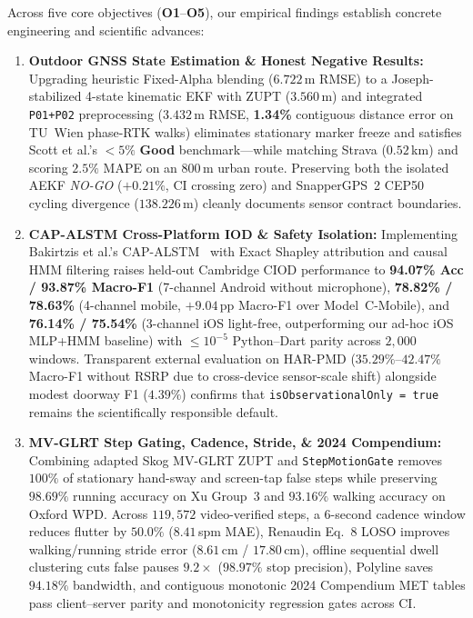 Across five core objectives (\textbf{O1}--\textbf{O5}), our empirical findings establish concrete engineering and scientific advances:
\begin{enumerate}
    \item \textbf{Outdoor GNSS State Estimation \& Honest Negative Results:} Upgrading heuristic Fixed-Alpha blending ($6.722$\,m RMSE) to a Joseph-stabilized 4-state kinematic EKF with ZUPT ($3.560$\,m) and integrated \texttt{P01+P02} preprocessing ($3.432$\,m RMSE, \textbf{1.34\%} contiguous distance error on TU~Wien phase-RTK walks) eliminates stationary marker freeze and satisfies Scott et al.'s $<5\%$ \textbf{Good} benchmark---while matching Strava ($0.52$\,km) and scoring $2.5\%$ MAPE on an $800$\,m urban route. Preserving both the isolated AEKF \textit{NO-GO} ($+0.21\%$, CI crossing zero) and SnapperGPS~2 CEP50 cycling divergence ($138.226$\,m) cleanly documents sensor contract boundaries.
    \item \textbf{CAP-ALSTM Cross-Platform IOD \& Safety Isolation:} Implementing Bakirtzis et al.'s CAP-ALSTM~\cite{bakirtzis2022ciod} with Exact Shapley attribution and causal HMM filtering raises held-out Cambridge CIOD performance to \textbf{94.07\% Acc / 93.87\% Macro-F1} (7-channel Android without microphone), \textbf{78.82\% / 78.63\%} (4-channel mobile, $+9.04$\,pp Macro-F1 over Model~C-Mobile), and \textbf{76.14\% / 75.54\%} (3-channel iOS light-free, outperforming our ad-hoc iOS MLP+HMM baseline) with $\le 10^{-5}$ Python--Dart parity across $2{,}000$ windows. Transparent external evaluation on HAR-PMD ($35.29\%$--$42.47\%$ Macro-F1 without RSRP due to cross-device sensor-scale shift) alongside modest doorway F1 ($4.39\%$) confirms that \texttt{isObservationalOnly = true} remains the scientifically responsible default.
    \item \textbf{MV-GLRT Step Gating, Cadence, Stride, \& 2024 Compendium:} Combining adapted Skog MV-GLRT ZUPT and \texttt{StepMotionGate} removes $100\%$ of stationary hand-sway and screen-tap false steps while preserving $98.69\%$ running accuracy on Xu Group~3 and $93.16\%$ walking accuracy on Oxford WPD. Across $119{,}572$ video-verified steps, a $6$-second cadence window reduces flutter by $50.0\%$ ($8.41$\,spm MAE), Renaudin Eq.~8 LOSO improves walking/running stride error ($8.61$\,cm / $17.80$\,cm), offline sequential dwell clustering cuts false pauses $9.2\times$ ($98.97\%$ stop precision), Polyline saves $94.18\%$ bandwidth, and contiguous monotonic 2024 Compendium MET tables pass client--server parity and monotonicity regression gates across CI.
\end{enumerate}

